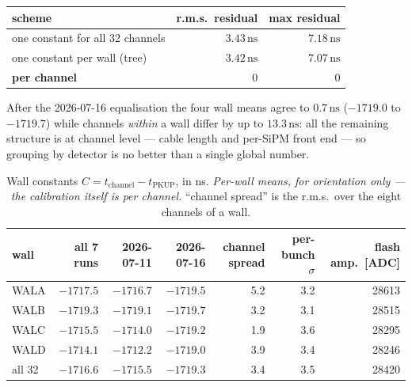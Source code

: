 \documentclass[11pt,a4paper]{article}
\newcommand{\ns}{\,\mathrm{ns}}
\begin{document}
\begin{center}\small
\begin{tabular}{lrr}
\toprule
scheme & r.m.s.\ residual & max residual \\
\midrule
one constant for all 32 channels & $3.43\ns$ & $7.18\ns$ \\
one constant per wall (tree) & $3.42\ns$ & $7.07\ns$ \\
\textbf{per channel} & $0$ & $0$ \\
\bottomrule
\end{tabular}
\end{center}

After the 2026-07-16 equalisation the four wall means agree to $0.7\ns$
($-1719.0$ to $-1719.7$) while channels \emph{within} a wall differ by up to
$13.3\ns$: all the remaining structure is at channel level --- cable length and
per-SiPM front end --- so grouping by detector is no better than a single global
number.

\begin{table}[htbp]
\centering
\small
\caption{Wall constants $C = t_\mathrm{channel}-t_\mathrm{PKUP}$, in ns.
\emph{Per-wall means, for orientation only --- the calibration itself is per
channel.} ``channel spread'' is the r.m.s.\ over the eight channels of a wall.}
\label{tab:walls}
\begin{tabular}{lrrrrrr}
\toprule
wall & all 7 runs & 2026-07-11 & \textbf{2026-07-16} & channel spread & per-bunch $\sigma$ & flash amp.\ [ADC] \\
\midrule
WALA & $-1717.5$ & $-1716.7$ & $\mathbf{-1719.5}$ & 5.2 & 3.2 & 28613 \\
WALB & $-1719.3$ & $-1719.1$ & $\mathbf{-1719.7}$ & 3.2 & 3.1 & 28515 \\
WALC & $-1715.5$ & $-1714.0$ & $\mathbf{-1719.2}$ & 1.9 & 3.6 & 28295 \\
WALD & $-1714.1$ & $-1712.2$ & $\mathbf{-1719.0}$ & 3.9 & 3.4 & 28246 \\
\midrule
all 32 & $-1716.6$ & $-1715.5$ & $\mathbf{-1719.3}$ & 3.4 & 3.5 & 28420 \\
\bottomrule
\end{tabular}
\end{table}
\end{document}
